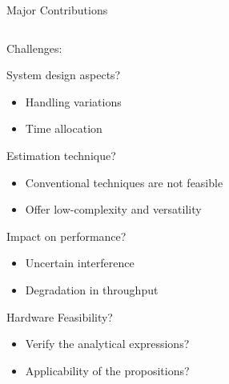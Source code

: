 \documentclass[16pt]{beamer}
\newcommand{\fs}[2]{\fontsize{#1 pt}{#2}\selectfont}
\begin{document}
\begin{frame}[t]{Major Contributions}
	\begin{columns}
		\begin{column}[t]{0.53\columnwidth}
			\centering Challenges: \\[-0.2em]
				\fs{8}{8}
				\begin{block}{\footnotesize System design aspects?} %
					\begin{itemize} 
						\item Handling variations 
						\item Time allocation 
					\end{itemize}
				\end{block}
				\vspace{3.4mm}
				{
				\begin{block}{\footnotesize Estimation technique?} %
					\begin{itemize}
						\item Conventional techniques are not feasible  
						\item Offer low-complexity and versatility %
					\end{itemize}
				\end{block}
				}
				\vspace{-1.1mm}
				{
				\begin{block}{\footnotesize Impact on performance?}%
					\begin{itemize}
						\item Uncertain interference 
						\item Degradation in throughput 
					\end{itemize} 
				\end{block}
				}	
				\vspace{-0.9mm}
				{
				\begin{block}{\footnotesize Hardware Feasibility?}%
					\begin{itemize}
					\item Verify the analytical expressions? 
					\item Applicability of the propositions? 
					\end{itemize}	
				\end{block}
				}
		\end{column}
		

\end{columns}
\end{frame}
\end{document}

